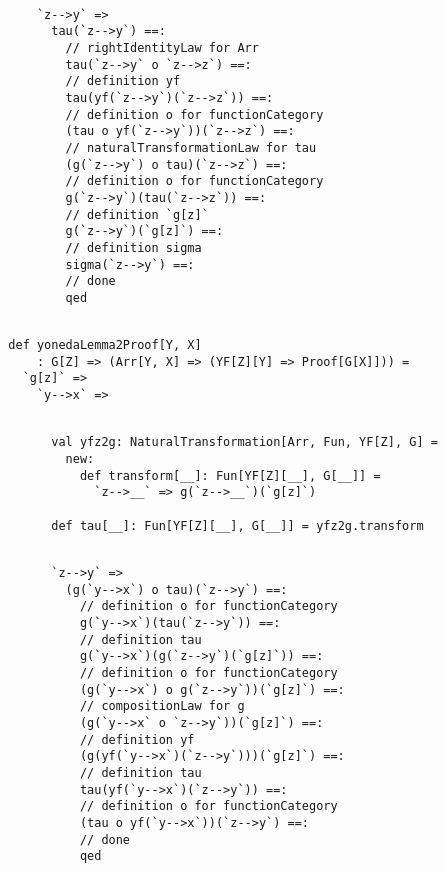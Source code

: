 \documentclass[11pt]{article}
\def\edefn{\endgroup\par\pagebreak[2]\addvspace{\medskipamount}}
\let\ecode=\edefn
\begin{document}
\vspace{6pt}
\begin{mdframed}[backgroundcolor=lightgray!20] 
\begin{lstlisting}

      `z-->y` =>
        tau(`z-->y`) ==:
          // rightIdentityLaw for Arr
          tau(`z-->y` o `z-->z`) ==:
          // definition yf
          tau(yf(`z-->y`)(`z-->z`)) ==:
          // definition o for functionCategory
          (tau o yf(`z-->y`))(`z-->z`) ==:
          // naturalTransformationLaw for tau
          (g(`z-->y`) o tau)(`z-->z`) ==:
          // definition o for functionCategory
          g(`z-->y`)(tau(`z-->z`)) ==:
          // definition `g[z]`
          g(`z-->y`)(`g[z]`) ==:
          // definition sigma
          sigma(`z-->y`) ==:
          // done
          qed
\end{lstlisting}
\end{mdframed}
\vspace{6pt}
\begin{mdframed}[backgroundcolor=lightgray!20] 
\begin{lstlisting}

  def yonedaLemma2Proof[Y, X]
      : G[Z] => (Arr[Y, X] => (YF[Z][Y] => Proof[G[X]])) =
    `g[z]` =>
      `y-->x` =>
\end{lstlisting}
\end{mdframed}
\vspace{6pt}
\begin{mdframed}[backgroundcolor=lightgray!20] 
\begin{lstlisting}

        val yfz2g: NaturalTransformation[Arr, Fun, YF[Z], G] =
          new:
            def transform[__]: Fun[YF[Z][__], G[__]] =
              `z-->__` => g(`z-->__`)(`g[z]`)

        def tau[__]: Fun[YF[Z][__], G[__]] = yfz2g.transform
\end{lstlisting}
\end{mdframed}
\vspace{6pt}
\clearpage
\begin{mdframed}[backgroundcolor=lightgray!20] 
\begin{lstlisting}

        `z-->y` =>
          (g(`y-->x`) o tau)(`z-->y`) ==:
            // definition o for functionCategory
            g(`y-->x`)(tau(`z-->y`)) ==:
            // definition tau
            g(`y-->x`)(g(`z-->y`)(`g[z]`)) ==:
            // definition o for functionCategory
            (g(`y-->x`) o g(`z-->y`))(`g[z]`) ==:
            // compositionLaw for g
            (g(`y-->x` o `z-->y`))(`g[z]`) ==:
            // definition yf
            (g(yf(`y-->x`)(`z-->y`)))(`g[z]`) ==:
            // definition tau
            tau(yf(`y-->x`)(`z-->y`)) ==:
            // definition o for functionCategory
            (tau o yf(`y-->x`))(`z-->y`) ==:
            // done
            qed
\end{lstlisting}
\end{mdframed}
\ecode
\end{document}
